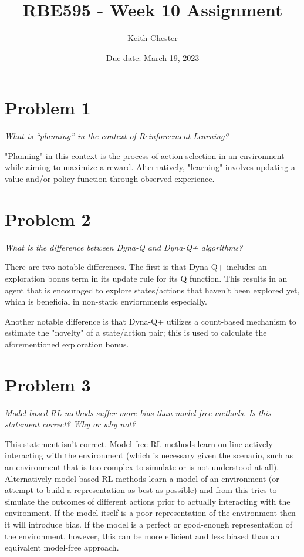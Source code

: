 \documentclass{article}
\title{RBE595 - Week 10 Assignment}
\author{Keith Chester}
\date{Due date: March 19, 2023}
\begin{document}
\maketitle

\section*{Problem 1}

\textit{What is “planning” in the context of Reinforcement Learning?}

"Planning" in this context is the process of action selection in an environment while aiming to maximize a reward. Alternatively, "learning" involves updating a value and/or policy function through observed experience.

\section*{Problem 2}

\textit{What is the difference between Dyna-Q and Dyna-Q+ algorithms?}

There are two notable differences. The first is that Dyna-Q+ includes an exploration bonus term in its update rule for its Q function. This results in an agent that is encouraged to explore states/actions that haven't been explored yet, which is beneficial in non-static enviornments especially.

Another notable difference is that Dyna-Q+ utilizes a count-based mechanism to estimate the "novelty" of a state/action pair; this is used to calculate the aforementioned exploration bonus.

\section*{Problem 3}

\textit{Model-based RL methods suffer more bias than model-free methods. Is this statement correct? Why or why not?}

This statement isn't correct. Model-free RL methods learn on-line actively interacting with the environment (which is necessary given the scenario, such as an environment that is too complex to simulate or is not understood at all). Alternatively model-based RL methods learn a model of an environment (or attempt to build a representation as best as possible) and from this tries to simulate the outcomes of different actions prior to actually interacting with the environment. If the model itself is a poor representation of the environment then it will introduce bias. If the model is a perfect or good-enough representation of the environment, however, this can be more efficient and less biased than an equivalent model-free approach.
\end{document}
